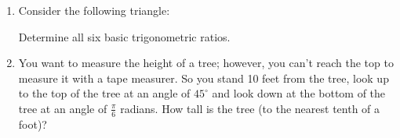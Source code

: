 \documentclass[letterpaper,12pt,fleqn]{article}
\begin{document}
\begin{enumerate}
\newpage

\item Consider the following triangle:


Determine all six basic trigonometric ratios.

\newpage

\item You want to measure the height of a tree; however, you can't reach the
top to measure it with a tape measurer. So you stand 10 feet from the tree,
look up to the top of the tree at an angle of $45^{\circ}$ and look down at the
bottom of the tree at an angle of $\frac{\pi}{6}$ radians.  How tall is the
tree (to the nearest tenth of a foot)?

\end{enumerate}
\end{document}
